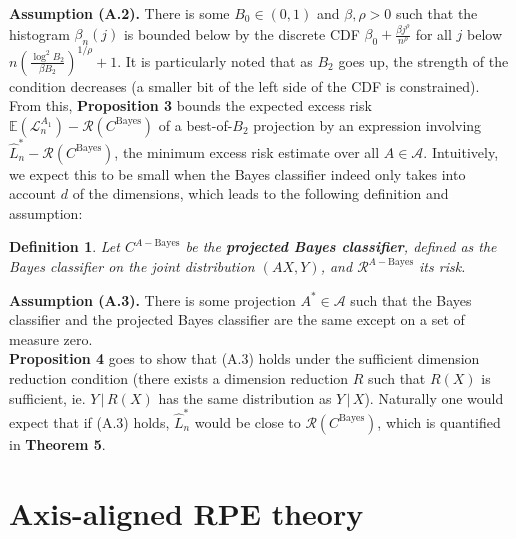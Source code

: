 \documentclass[ejs,preprint]{imsart}
\newtheorem{definition}{Definition}
\newcommand\cbayes{C^{\mathrm{Bayes}}}
\newcommand\risk{\mathcal{L}}
\newcommand\rrisk{\mathcal{R}}
\newcommand\cabayes{C^{A-\mathrm{Bayes}}}
\newcommand\rabayes{\rrisk^{A-\mathrm{Bayes}}}
\begin{document}
\noindent \textbf{Assumption (A.2).} There is some $B_{0}\in(0,1)$
and $\beta,\rho>0$ such that the histogram $\beta_{n}(j)$ is bounded
below by the discrete CDF $\beta_{0}+\frac{\beta j^{\rho}}{n^{\rho}}$
for all $j$ below $n\left(\frac{\log^{2}B_{2}}{\beta B_{2}}\right)^{1/\rho}+1$.
It is particularly noted that as $B_{2}$ goes up, the strength of
the condition decreases (a smaller bit of the left side of the CDF
is constrained).\\


From this, \textbf{Proposition 3} bounds the expected excess risk
$\mathbb{E}(\risk_{n}^{A_{1}})-\rrisk(\cbayes)$ of a best-of-$B_{2}$
projection by an expression involving $\hat{L}_{n}^{*}-\rrisk(\cbayes)$,
the minimum excess risk estimate over all $A\in\mathcal A$. Intuitively,
we expect this to be small when the Bayes classifier indeed only takes
into account $d$ of the dimensions, which leads to the following
definition and assumption:

\begin{definition}
Let $\cabayes$ be the \textbf{projected Bayes classifier}, defined
as the Bayes classifier on the joint distribution $(AX,Y)$, and $\rabayes$
its risk.
\end{definition}


\noindent \textbf{Assumption (A.3).} There is some projection $A^{*}\in\mathcal{A}$
such that the Bayes classifier and the projected Bayes classifier
are the same except on a set of measure zero.\\


\textbf{Proposition 4} goes to show that (A.3) holds under the sufficient
dimension reduction condition (there exists a dimension reduction
$R$ such that $R(X)$ is sufficient, ie. $Y\,|\,R(X)$ has the same
distribution as $Y\,|\,X$). Naturally one would expect that if (A.3)
holds, $\hat{L}_{n}^{*}$ would be close to $\rrisk(\cbayes)$, which
is quantified in \textbf{Theorem 5}.





















\section{Axis-aligned RPE theory}
\end{document}
